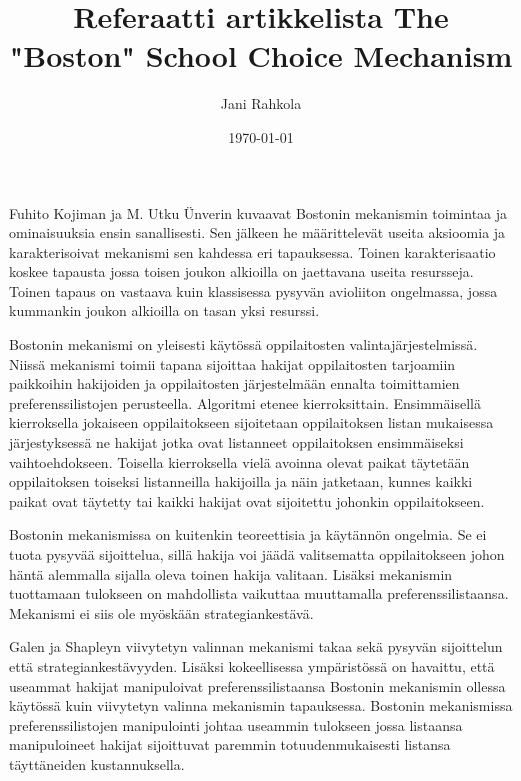 \documentclass{tktltiki}
\begin{document}
\title{Referaatti artikkelista The "Boston" School Choice Mechanism}
\author{Jani Rahkola}
\date{\today}

\maketitle

\doublespacing

\subject{Tietojenkäsittelytiede}


Fuhito Kojiman ja M. Utku Ünverin kuvaavat Bostonin mekanismin
toimintaa ja ominaisuuksia ensin sanallisesti. Sen jälkeen he
määrittelevät useita aksioomia ja karakterisoivat mekanismi sen
kahdessa eri tapauksessa. Toinen karakterisaatio koskee tapausta jossa
toisen joukon alkioilla on jaettavana useita resursseja. Toinen tapaus
on vastaava kuin klassisessa pysyvän avioliiton ongelmassa, jossa
kummankin joukon alkioilla on tasan yksi resurssi.

Bostonin mekanismi on yleisesti käytössä oppilaitosten
valintajärjestelmissä. Niissä mekanismi toimii tapana sijoittaa
hakijat oppilaitosten tarjoamiin paikkoihin hakijoiden ja
oppilaitosten järjestelmään ennalta toimittamien preferenssilistojen
perusteella. Algoritmi etenee kierroksittain. Ensimmäisellä
kierroksella jokaiseen oppilaitokseen sijoitetaan oppilaitoksen listan
mukaisessa järjestyksessä ne hakijat jotka ovat listanneet
oppilaitoksen ensimmäiseksi vaihtoehdokseen. Toisella kierroksella
vielä avoinna olevat paikat täytetään oppilaitoksen toiseksi
listanneilla hakijoilla ja näin jatketaan, kunnes kaikki paikat ovat
täytetty tai kaikki hakijat ovat sijoitettu johonkin oppilaitokseen.

Bostonin mekanismissa on kuitenkin teoreettisia ja käytännön ongelmia.
Se ei tuota pysyvää sijoittelua, sillä hakija voi jäädä valitsematta
oppilaitokseen johon häntä alemmalla sijalla oleva toinen hakija
valitaan. Lisäksi mekanismin tuottamaan tulokseen on mahdollista
vaikuttaa muuttamalla preferenssilistaansa. Mekanismi ei siis ole
myöskään strategiankestävä.

Galen ja Shapleyn viivytetyn valinnan mekanismi takaa sekä
pysyvän sijoittelun että strategiankestävyyden. Lisäksi kokeellisessa
ympäristössä on havaittu, että useammat hakijat manipuloivat
preferenssilistaansa Bostonin mekanismin ollessa käytössä kuin
viivytetyn valinna mekanismin tapauksessa. Bostonin mekanismissa
preferenssilistojen manipulointi johtaa useammin tulokseen jossa
listaansa manipuloineet hakijat sijoittuvat paremmin
totuudenmukaisesti listansa täyttäneiden kustannuksella.
\end{document}
